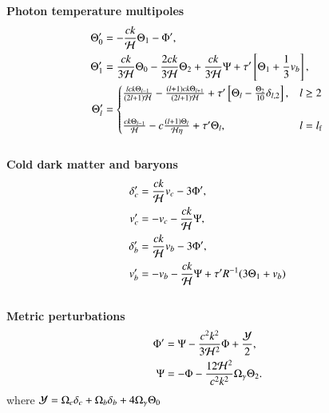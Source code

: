     \begin{tcolorbox}[
        width=1.025\linewidth,
        colback=blue!5!white,
        colframe=white
    ]
    
    \textbf{Photon temperature multipoles}
    \begin{subequations}\label{eq:m3:theory:photon_temp_multipoles}
        \begin{align}
            \Theta_0' &= -\frac{ck}{\mathcal{H}}\Theta_1-\Phi',\label{eq:m3:theory:photon_monopole}\\
            \Theta_1' &= \frac{ck}{3\mathcal{H}}\Theta_0 - \frac{2ck}{3\mathcal{H}}\Theta_2 +\frac{ck}{3\mathcal{H}}\Psi+\tau'\left[\Theta_1+\frac{1}{3}v_b\right],\label{eq:m3:theory:photon_dipole}\\
            \Theta_l' &= \begin{cases}
                \frac{lck\Theta_{l-1}}{(2l+1)\mathcal{H}} -\frac{(l+1)ck\Theta_{l+1}}{(2l+1)\mathcal{H}} +\tau'\left[\Theta_l-\frac{\Theta_2}{10}\delta_{l,2}\right], &l\geq2\\
                \\
                \frac{ck\Theta_{l-1}}{\mathcal{H}} - c\frac{(l+1)\Theta_l}{\mathcal{H}\eta}+\tau'\Theta_l, &l=l_\mathrm{f}
            \end{cases}\label{eq:m3:theory:photon_multipole}
        \end{align}
    \end{subequations}
    \\
    \textbf{Cold dark matter and baryons}
    \begin{subequations}\label{eq:m3:theory:cdm_baryon_diffeqs}
        \begin{align}
            \delta'_c &= \frac{ck}{\mathcal{H}}v_c-3\Phi', \label{eq:m3:theory:delta_cdm}\\
            v'_c &= -v_c-\frac{ck}{\mathcal{H}}\Psi, \label{eq:m3:theory:v_cdm}\\
            \delta'_b &= \frac{ck}{\mathcal{H}}v_b - 3\Phi', \label{eq:m3:theory:delta_b}\\
            v'_b &= -v_b - \frac{ck}{\mathcal{H}}\Psi + \tau'R^{-1}(3\Theta_1+v_b) \label{eq:m3:theory:v_b}
        \end{align}
    \end{subequations}
    \\
    \textbf{Metric perturbations}
    \begin{subequations}\label{eq:m3:theory:metric_perturbations_final}
        \begin{align}
            \Phi' &= \Psi - \frac{c^2k^2}{3\mathcal{H}^2}\Phi + \frac{\mathcal{Y}}{2}, \label{eq:m3:theory:phi_perturbation}\\
            \Psi &= -\Phi - \frac{12\mathcal{H}^2}{c^2k^2}\Omega_\gamma\Theta_2. \label{eq:m3:theory:psi_perturbation}
        \end{align}
    \end{subequations}
    where $\mathcal{Y} = \Omega_c\delta_c+\Omega_b\delta_b+4\Omega_\gamma\Theta_0$ 

\end{tcolorbox}

